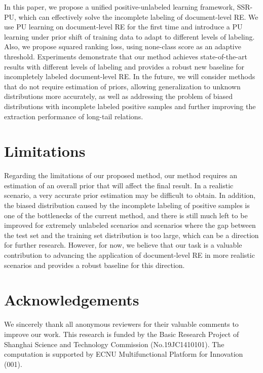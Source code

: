 \documentclass[11pt]{article}
\begin{document}
In this paper, we propose a unified positive-unlabeled learning framework, SSR-PU, which can effectively solve the incomplete labeling of document-level RE. We use PU learning on document-level RE for the first time and introduce a PU learning under prior shift of training data to adapt to different levels of labeling. Also, we propose squared ranking loss, using none-class score as an adaptive threshold. Experiments demonstrate that our method achieves state-of-the-art results with different levels of labeling and provides a robust new baseline for incompletely labeled document-level RE. \enspace In the future, we will consider methods that do not require estimation of priors, allowing generalization to unknown distributions more accurately, as well as addressing the problem of biased distributions with incomplete labeled positive samples and further improving the extraction performance of long-tail relations.

\section*{Limitations}
Regarding the limitations of our proposed method, our method requires an estimation of an overall prior that will affect the final result. In a realistic scenario, a very accurate prior estimation may be difficult to obtain. In addition, the biased distribution caused by the incomplete labeling of positive samples is one of the bottlenecks of the current method, and there is still much left to be improved for extremely unlabeled scenarios and scenarios where the gap between the test set and the training set distribution is too large, which can be a direction for further research. However, for now, we believe that our task is a valuable contribution to advancing the application of document-level RE in more realistic scenarios and provides a robust baseline for this direction.

\section*{Acknowledgements}
We sincerely thank all anonymous reviewers
for their valuable comments to improve our work. This research is funded by the Basic Research Project of Shanghai Science and Technology Commission (No.19JC1410101). The computation is supported by ECNU Multifunctional Platform for Innovation (001).



\end{document}
